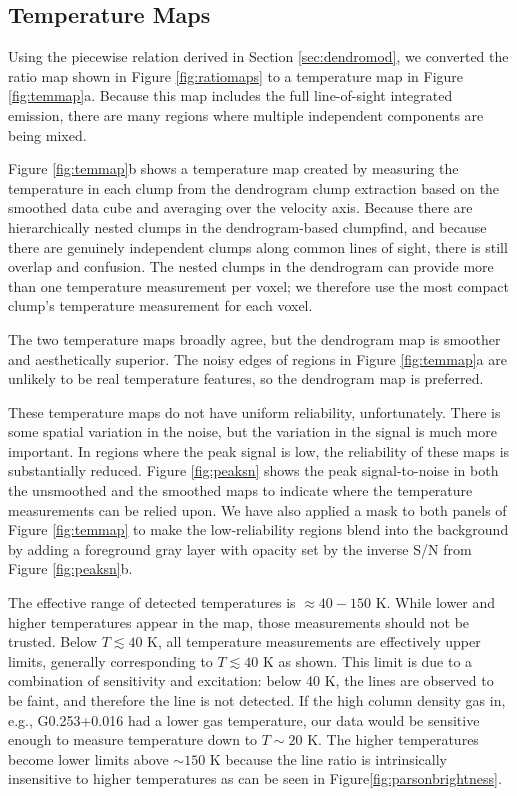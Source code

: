 \subsection{Temperature Maps}
\label{sec:formaldehydetemmap}
Using the piecewise relation derived in Section \ref{sec:dendromod}, we
converted the ratio map shown in Figure \ref{fig:ratiomaps} to a temperature
map in Figure \ref{fig:temmap}a.  Because this map includes the full line-of-sight
integrated emission, there are many regions where multiple independent components
are being mixed.

Figure \ref{fig:temmap}b shows a temperature map created by measuring the
temperature in each clump from the dendrogram clump extraction based on the
smoothed data cube and averaging over the velocity axis.  Because there are
hierarchically nested clumps in the dendrogram-based clumpfind, and because
there are genuinely independent clumps along common lines of sight, there is
still overlap and confusion.  The nested clumps in the dendrogram can provide
more than one temperature measurement per voxel; we therefore use the most
compact clump's temperature measurement for each voxel.

The two temperature maps broadly agree, but the dendrogram map is smoother and
aesthetically superior.  The noisy edges of regions in Figure \ref{fig:temmap}a
are unlikely to be real temperature features, so the dendrogram map is
preferred.

These temperature maps do not have uniform reliability, unfortunately.  There
is some spatial variation in the noise, but the variation in the signal is much
more important.  In regions where the peak signal is low, the reliability of
these maps is substantially reduced.  Figure \ref{fig:peaksn} shows the peak
signal-to-noise in both the unsmoothed and the smoothed maps to indicate where
the temperature measurements can be relied upon.  We have also applied a mask
to both panels of Figure \ref{fig:temmap} to make the low-reliability regions
blend into the background by adding a foreground gray layer with opacity set by
the inverse S/N from Figure \ref{fig:peaksn}b.

The effective range of detected temperatures is $\approx40-150$ K. While lower
and higher temperatures appear in the map, those measurements should not be
trusted.  Below $T\lesssim40$ K, all temperature measurements are effectively
upper limits, generally corresponding to $T\lesssim40$ K as shown.  This limit
is due to a combination of sensitivity and excitation: below 40 K, the \para
lines are observed to be faint, and therefore the \threetwoone line is not
detected.  If the high column density gas in, e.g., G0.253+0.016 had a lower
gas temperature, our data would be sensitive enough to measure temperature down
to $T\sim20$ K.  The higher temperatures become lower limits above $\sim150$ K
because the \para line ratio is intrinsically insensitive to higher
temperatures as can be seen in Figure\ref{fig:parsonbrightness}.

